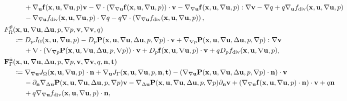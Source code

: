 \documentclass[oneside]{book}
\numberwithin{equation}{section}
\begin{document}
\begin{itemize}[leftmargin=0in]
\begin{align*}
        &\hspace{1cm}+ \nabla_{\bf u}{\bf f}({\bf x},{\bf u},\nabla{\bf u},p){\bf v} - \nabla\cdot\left(\nabla_{\nabla{\bf u}}{\bf f}({\bf x},{\bf u},\nabla{\bf u},p)\right)\cdot{\bf v} - \nabla_{\nabla{\bf u}}{\bf f}({\bf x},{\bf u},\nabla{\bf u},p):\nabla{\bf v} - \nabla q + q\nabla_{\bf u}f_{\rm div}({\bf x},{\bf u},\nabla{\bf u},p)\\
        &\hspace{1cm}- \nabla_{\nabla{\bf u}}f_{\rm div}({\bf x},{\bf u},\nabla{\bf u},p)\cdot\nabla q - q\nabla\cdot\left(\nabla_{\nabla{\bf u}}f_{\rm div}({\bf x},{\bf u},\nabla{\bf u},p)\right),\\
        &F_\Omega^{\tilde{p}}({\bf x},{\bf u},\nabla{\bf u},\Delta{\bf u},p,\nabla p,{\bf v},\nabla{\bf v},q)\\
        &\hspace{5mm}\coloneqq D_pJ_\Omega({\bf x},{\bf u},\nabla{\bf u},p) - D_p{\bf P}({\bf x},{\bf u},\nabla{\bf u},\Delta{\bf u},p,\nabla p)\cdot{\bf v} + \nabla_{\nabla p}{\bf P}({\bf x},{\bf u},\nabla{\bf u},\Delta{\bf u},p,\nabla p):\nabla{\bf v}\\
        &\hspace{1cm} + \nabla\cdot\left(\nabla_{\nabla p}{\bf P}({\bf x},{\bf u},\nabla{\bf u},\Delta{\bf u},p,\nabla p)\right)\cdot{\bf v} + D_p{\bf f}({\bf x},{\bf u},\nabla{\bf u},p)\cdot{\bf v} + qD_pf_{\rm div}({\bf x},{\bf u},\nabla{\bf u},p),\\
        &{\bf F}_\Gamma^{\tilde{\bf u}}({\bf x},{\bf u},\nabla{\bf u},\Delta{\bf u},p,\nabla p,{\bf v},\nabla{\bf v},q,{\bf n},{\bf t})\\
        &\hspace{5mm}\coloneqq\nabla_{\nabla{\bf u}}J_\Omega({\bf x},{\bf u},\nabla{\bf u},p)\cdot{\bf n} + \nabla_{\bf u}J_\Gamma({\bf x},{\bf u},\nabla{\bf u},p,{\bf n},{\bf t}) - \left(\nabla_{\nabla{\bf u}}{\bf P}({\bf x},{\bf u},\nabla{\bf u},\Delta{\bf u},p,\nabla p)\cdot{\bf n}\right)\cdot{\bf v}\\
        &\hspace{1cm} - \partial_{\bf n}\nabla_{\Delta{\bf u}}{\bf P}({\bf x},{\bf u},\nabla{\bf u},\Delta{\bf u},p,\nabla p){\bf v} - \nabla_{\Delta{\bf u}}{\bf P}({\bf x},{\bf u},\nabla{\bf u},\Delta{\bf u},p,\nabla p)\partial_{\bf n}{\bf v} + \left(\nabla_{\nabla{\bf u}}{\bf f}({\bf x},{\bf u},\nabla{\bf u},p)\cdot{\bf n}\right)\cdot{\bf v} + q{\bf n}\\
        &\hspace{1cm} + q\nabla_{\nabla{\bf u}}f_{\rm div}({\bf x},{\bf u},\nabla{\bf u},p)\cdot{\bf n},\\

\end{align*}
\end{itemize}
\end{document}
